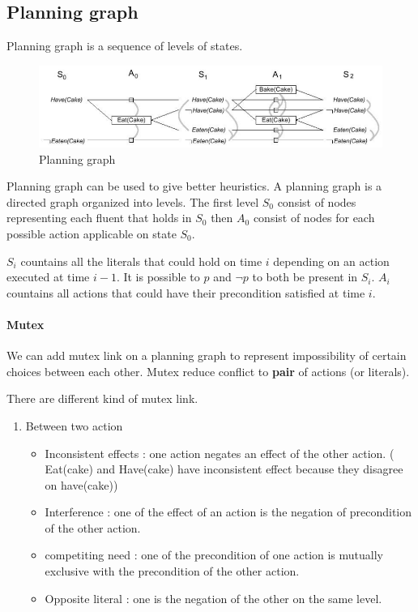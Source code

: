 \subsection{Planning graph}
Planning graph is a sequence of levels of states.

\begin{figure}[h]
    \centering
    \includegraphics[width=16cm]{planning.png}
    \caption{Planning graph}
\end{figure}

Planning graph can be used to give better heuristics. A planning graph is a directed graph organized into levels. The first level $S_0$ consist of nodes representing each fluent that holds in $S_0$ then $A_0$ consist of nodes for each possible action applicable on state $S_0$.


$S_i$ countains all the literals that could hold on time $i$ depending on an action executed at time $i-1$. It is possible to $p$ and $\lnot p$ to both be present in $S_i$. $A_i$ countains all actions that could have their precondition satisfied at time $i$.

\paragraph{Mutex}

We can  add mutex link  on a  planning graph to  represent impossibility
of  certain  choices  between  each  other.  Mutex  reduce  conflict  to
\textbf{pair} of actions (or literals).

There are different kind of mutex link.

\begin{enumerate}
    \item Between two action
        \begin{itemize}
            \item Inconsistent effects : one action negates an effect of the other action. ( Eat(cake) and Have(cake) have inconsistent effect because
            they disagree on have(cake))

            \item Interference : one of the effect of an action is the negation of precondition of the other action.

            \item competiting need : one of the precondition of one action is mutually exclusive with the precondition of the other action.

            \item Opposite literal : one is the negation of the other on the same level.
        \end{itemize}
\end{enumerate}

